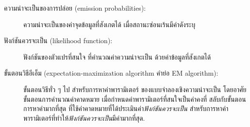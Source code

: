 \begin{description}
	\item[ความน่าจะเป็นของการปล่อย (emission  probabilities):]
ความน่าจะเป็นของค่าจุดข้อมูลที่สังเกตได้ เมื่อสถานะซ่อนเร้นมีค่าดังระบุ

	\item[ฟังก์ชันควรจะเป็น  (likelihood function):]
ฟังก์ชันของตัวแปรที่สนใจ ที่คำนวณค่าความน่าจะเป็น ด้วยค่าข้อมูลที่สังเกตได้

	\item[ขั้นตอนวิธีอีเอ็ม (expectation-maximization algorithm คำย่อ EM algorithm):]
ขั้นตอนวิธีทั่ว ๆ ไป สำหรับการหาค่าพารามิเตอร์ ของแบบจำลองเชิงความน่าจะเป็น
โดยอาศัยขั้นตอนการคำนวณค่าคาดหมาย เมื่อกำหนดค่าพารามิเตอร์ที่สนใจเป็นค่าคงที่
สลับกับขั้นตอนการหาค่ามากที่สุด 
ที่ใช้ค่าคาดหมายที่ได้ประเมินค่า\textit{ฟังก์ชันควรจะเป็น} สำหรับการหาค่าพารามิเตอร์ที่ทำให้\textit{ฟังก์ชันควรจะเป็น}มีค่ามากที่สุด.

\end{description}


